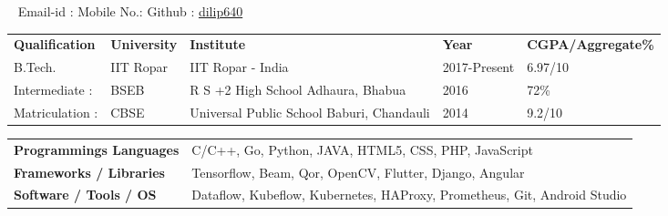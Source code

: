 \documentclass[a4paper,12pt]{awesome}
\newcommand{\psep}{-0.6cm}
\begin{document}
\ \linebreak
{} \hfill Email-id :  \linebreak
{} \hfill Mobile No.:  \linebreak
{} \hfill Github : \href{https://github.com/dilip640}{dilip640}
\linebreak \linebreak
{}

\begin{tabular}{ l @{\hskip 0.12in} l @{\hskip 0.12in} l @{\hskip 0.12in} l @{\hskip 0.12in} l }

\textbf{Qualification} & \textbf{University} & \textbf{Institute} & \textbf{Year} & \textbf{CGPA/Aggregate\%} \\

B.Tech.& IIT Ropar & IIT Ropar  - India & 2017-Present & 6.97/10 \\
Intermediate :& BSEB & R S +2 High School Adhaura, Bhabua & 2016  &  72\% \\
Matriculation :& CBSE & Universal Public School Baburi, Chandauli  & 2014& 9.2/10 \\
\end{tabular} \linebreak
{}\linebreak
\indent 
\begin{tabular}{ l @{\hskip 0.006cm} l }
    \textbf{Programmings Languages } & C/C++, Go, Python, JAVA, HTML5, CSS, PHP, JavaScript \\
    \textbf{Frameworks / Libraries} & Tensorflow, Beam, Qor, OpenCV, Flutter, Django, Angular \\ 
    \textbf{Software / Tools / OS} & Dataflow, Kubeflow, Kubernetes, HAProxy, Prometheus, Git, Android Studio  \\
\end{tabular}\\
\linebreak
{}\\[\psep]
\end{document}
